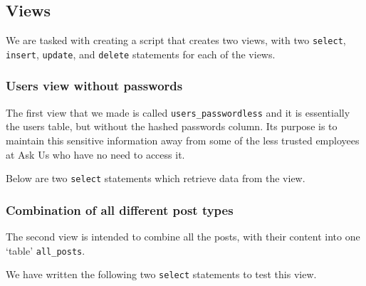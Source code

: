\subsection{Views}

We are tasked with creating a script that creates two views, with two \verb`select`, \verb`insert`, \verb`update`, and \verb`delete` statements for each of the views.

\subsubsection{Users view without passwords}

The first view that we made is called \verb`users_passwordless` and it is essentially the users table, but without the hashed passwords column. Its purpose is to maintain this sensitive information away from some of the less trusted employees at Ask Us who have no need to access it.


Below are two \verb`select` statements which retrieve data from the view.


\subsubsection{Combination of all different post types}

The second view is intended to combine all the posts, with their content into one `table' \verb`all_posts`.


We have written the following two \verb`select` statements to test this view.

